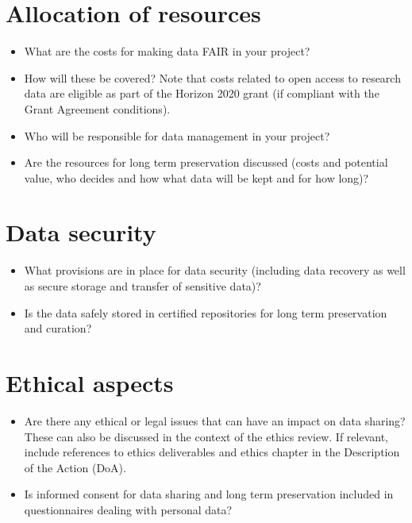 \documentclass{article}
\begin{document}
\section{Allocation of resources}
\begin{itemize}
    \item  What are the costs for making data FAIR in your project?
    \item How will these be covered? Note that costs related to open access to research data are eligible as part of the Horizon 2020 grant (if compliant with the Grant Agreement conditions).
    \item Who will be responsible for data management in your project?
    \item Are the resources for long term preservation discussed (costs and potential value, who decides and how what data will be kept and for how long)?
\end{itemize}

\section{Data security}
\begin{itemize}
    \item What provisions are in place for data security (including data recovery as well as secure storage and transfer of sensitive data)?
    \item Is the data safely stored in certified repositories for long term preservation and curation?
\end{itemize}

\section{Ethical aspects}
\begin{itemize}
    \item Are there any ethical or legal issues that can have an impact on data sharing? These can also be discussed in the context of the ethics review. If relevant, include references to ethics deliverables and ethics chapter in the Description of the Action (DoA).
    \item Is informed consent for data sharing and long term preservation included in questionnaires dealing with personal data?
\end{itemize}
\end{document}
